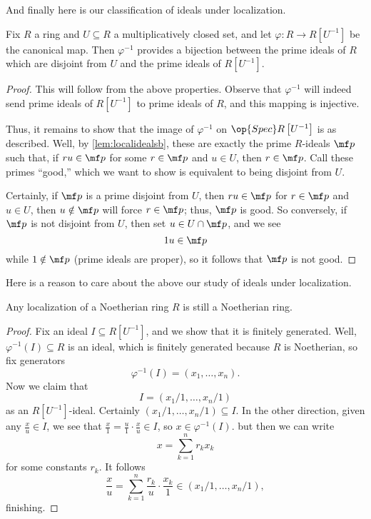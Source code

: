 And finally here is our classification of ideals under localization.
\begin{theorem}
	Fix $R$ a ring and $U\subseteq R$ a multiplicatively closed set, and let $\varphi:R\to R\left[U^{-1}\right]$ be the canonical map. Then $\varphi^{-1}$ provides a bijection between the prime ideals of $R$ which are disjoint from $U$ and the prime ideals of $R\left[U^{-1}\right]$.
\end{theorem}
\begin{proof}
	This will follow from the above properties. Observe that $\varphi^{-1}$ will indeed send prime ideals of $R\left[U^{-1}\right]$ to prime ideals of $R$, and this mapping is injective.

	Thus, it remains to show that the image of $\varphi^{-1}$ on $\op{Spec}R\left[U^{-1}\right]$ is as described. Well, by \autoref{lem:localidealsb}, these are exactly the prime $R$-ideals $\mf p$ such that, if $ru\in \mf p$ for some $r\in\mf p$ and $u\in U$, then $r\in\mf p$. Call these primes ``good,'' which we want to show is equivalent to being disjoint from $U$.

	Certainly, if $\mf p$ is a prime disjoint from $U$, then $ru\in\mf p$ for $r\in\mf p$ and $u\in U$, then $u\notin\mf p$ will force $r\in\mf p$; thus, $\mf p$ is good. So conversely, if $\mf p$ is not disjoint from $U$, then set $u\in U\cap\mf p$, and we see
	\[1u\in\mf p\]
	while $1\notin\mf p$ (prime ideals are proper), so it follows that $\mf p$ is not good.
\end{proof}
Here is a reason to care about the above our study of ideals under localization.
\begin{corollary}
	Any localization of a Noetherian ring $R$ is still a Noetherian ring.
\end{corollary}
\begin{proof}
	Fix an ideal $I\subseteq R\left[U^{-1}\right]$, and we show that it is finitely generated. Well, $\varphi^{-1}(I)\subseteq R$ is an ideal, which is finitely generated because $R$ is Noetherian, so fix generators
	\[\varphi^{-1}(I)=(x_1,\ldots,x_n).\]
	Now we claim that
	\[I=(x_1/1,\ldots,x_n/1)\]
	as an $R\left[U^{-1}\right]$-ideal. Certainly $(x_1/1,\ldots,x_n/1)\subseteq I$. In the other direction, given any $\frac xu\in I$, we see that $\frac x1=\frac u1\cdot\frac xu\in I$, so $x\in\varphi^{-1}(I)$. but then we can write
	\[x=\sum_{k=1}^nr_kx_k\]
	for some constants $r_k$. It follows
	\[\frac xu=\sum_{k=1}^n\frac{r_k}u\cdot\frac{x_k}1\in(x_1/1,\ldots,x_n/1),\]
	finishing.
\end{proof}

